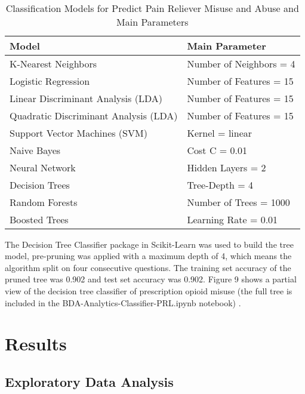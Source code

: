 \\\documentclass[sigconf]{acmart}
\begin{document}

\begin{table}
  \caption{Classification Models for Predict Pain Reliever Misuse 
  and Abuse and Main Parameters}
  \label{tab:freq}
  \begin{tabular}{ll}
    \toprule
    Model & Main Parameter \\
    \midrule
    K-Nearest Neighbors & Number of Neighbors = 4 \\
    Logistic Regression & Number of Features = 15 \\
    Linear Discriminant Analysis (LDA) & Number of Features = 15 \\
    Quadratic Discriminant Analysis (LDA) & Number of Features = 15 \\
    Support Vector Machines (SVM) & Kernel = linear \\
    Naive Bayes & Cost C = 0.01 \\
    Neural Network & Hidden Layers = 2 \\
    Decision Trees & Tree-Depth = 4 \\ 
    Random Forests & Number of Trees = 1000 \\
    Boosted Trees & Learning Rate = 0.01 \\ 
    \bottomrule
  \end{tabular}
\end{table}


The Decision Tree Classifier package in Scikit-Learn was used to build the 
tree model, pre-pruning was applied with a maximum depth of 4, which means 
the algorithm split on four consecutive questions. The training set accuracy 
of the pruned tree was 0.902 and test set accuracy was 0.902. Figure 9 shows 
a partial view of the decision tree classifier of prescription opioid misuse
(the full tree is included in the BDA-Analytics-Classifier-PRL.ipynb 
notebook) \cite{classifyPRL}. 

\section{Results}

\subsection{Exploratory Data Analysis}
\end{document}
